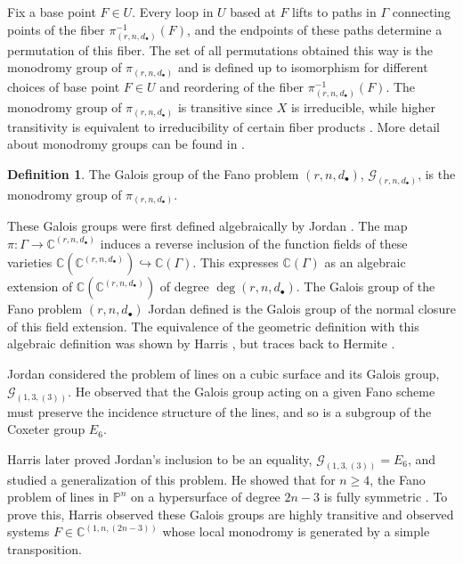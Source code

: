 \documentclass[12pt]{amsart}
\theoremstyle{definition}
\newtheorem{definition}[theorem]{Definition}
\newcommand{\gal}{\mathcal{G}}
\newcommand{\defcolor}[1]{{\color{RoyalBlue}#1}}
\begin{document}
Fix a base point $F\in U$. Every loop in $U$ based at $F$ lifts to paths in $\Gamma$ connecting points of the fiber $\pi_{(r,n,d_\bullet)}^{-1}(F)$, and the endpoints of these paths determine a permutation of this fiber. The set of all permutations obtained this way is the monodromy group of $\pi_{(r,n,d_\bullet)}$ and is defined up to isomorphism for different choices of base point $F\in U$ and reordering of the fiber $\pi_{(r,n,d_\bullet)}^{-1}(F)$. The monodromy group of $\pi_{(r,n,d_\bullet)}$ is transitive since $X$ is irreducible, while higher transitivity is equivalent to irreducibility of certain fiber products \cite{ngalois,GGEGA}. More detail about monodromy groups can be found in \cite{Hatcher}. 

\begin{definition}
The \defcolor{Galois group} of the Fano problem $(r,n,d_\bullet)$, $\gal_{(r,n,d_\bullet)}$, is the monodromy group of $\pi_{(r,n,d_\bullet)}$. 
\end{definition}

These Galois groups were first defined algebraically by Jordan \cite{Jordan}. The map $\pi:\Gamma\to\mathbb{C}^{(r,n,d_\bullet)}$ induces a reverse inclusion of the function fields of these varieties $\mathbb{C}(\mathbb{C}^{(r,n,d_\bullet)})\hookrightarrow\mathbb{C}(\Gamma)$. This expresses $\mathbb{C}(\Gamma)$ as an algebraic extension of $\mathbb{C}(\mathbb{C}^{(r,n,d_\bullet)})$ of degree $\deg(r,n,d_\bullet)$. The Galois group of the Fano problem $(r,n,d_\bullet)$ Jordan defined is the Galois group of the normal closure of this field extension. The equivalence of the geometric definition with this algebraic definition was shown by Harris \cite{Harris}, but traces back to Hermite \cite{Hermite}. 

Jordan considered the problem of lines on a cubic surface and its Galois group, $\gal_{(1,3,(3))}$. He observed that the Galois group acting on a given Fano scheme must preserve the incidence structure of the lines, and so is a subgroup of the Coxeter group $E_6$. 

Harris later proved Jordan's inclusion to be an equality, $\gal_{(1,3,(3))} = E_6$, and studied a generalization of this problem. He showed that for $n\ge 4$, the Fano problem of lines in $\mathbb{P}^n$ on a hypersurface of degree $2n-3$ is fully symmetric \cite{Harris}. To prove this, Harris observed these Galois groups are highly transitive and observed systems $F\in\mathbb{C}^{(1,n,(2n-3))}$ whose local monodromy is generated by a simple transposition.
\end{document}
